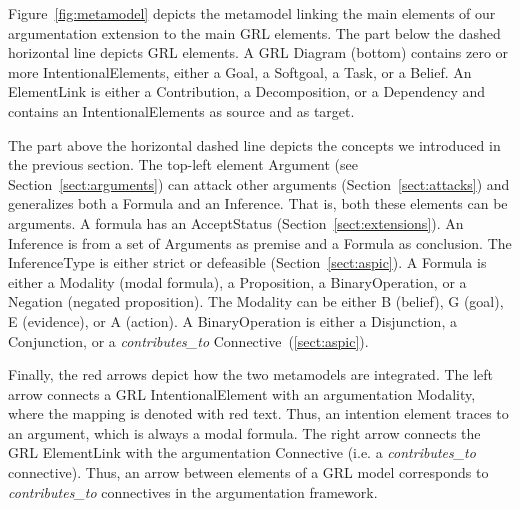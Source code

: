 
Figure~\ref{fig:metamodel} depicts the metamodel linking the main elements of our argumentation extension to the main GRL elements. The part below the dashed horizontal line depicts GRL elements. A \textsf{GRL Diagram} (bottom) contains zero or more \textsf{IntentionalElements}, either a \textsf{Goal}, a \textsf{Softgoal}, a \textsf{Task}, or a \textsf{Belief}. An \textsf{ElementLink} is either a \textsf{Contribution}, a \textsf{Decomposition}, or a \textsf{Dependency} and contains an \textsf{IntentionalElements} as source and as target.

The part above the horizontal dashed line depicts the concepts we introduced in the previous section. The top-left element \textsf{Argument} (see Section~\ref{sect:arguments}) can attack other arguments (Section~\ref{sect:attacks}) and generalizes both a \textsf{Formula} and an \textsf{Inference}. That is, both these elements can be arguments. A formula has an \textsf{AcceptStatus} (Section~\ref{sect:extensions}). An \textsf{Inference} is from a set of \textsf{Arguments} as premise and a \textsf{Formula} as conclusion. The \textsf{InferenceType} is either strict or defeasible (Section~\ref{sect:aspic}). A \textsf{Formula} is either a \textsf{Modality} (modal formula), a \textsf{Proposition}, a \textsf{BinaryOperation}, or a \textsf{Negation} (negated proposition). The \textsf{Modality} can be either B (belief), G (goal), E (evidence), or A (action). A \textsf{BinaryOperation} is either a \textsf{Disjunction}, a \textsf{Conjunction}, or a \emph{contributes\_to} \textsf{Connective}~(\ref{sect:aspic}).

Finally, the red arrows depict how the two metamodels are integrated. The left arrow connects a GRL \textsf{IntentionalElement} with an argumentation \textsf{Modality}, where the mapping is denoted with red text. Thus, an intention element traces to an argument, which is always a modal formula. The right arrow connects the GRL \textsf{ElementLink} with the argumentation \textsf{Connective} (i.e. a \emph{contributes\_to} connective). Thus, an arrow between elements of a GRL model corresponds to \emph{contributes\_to} connectives in the argumentation framework.


